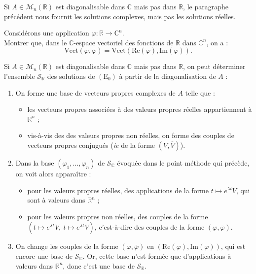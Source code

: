 \documentclass[french]{article}
\newcommand{\R}{\mathbb{R}}
\newcommand{\C}{\mathbb{C}}
\newcommand{\Vect}{\text{Vect}}
\theoremstyle{plain}
\theoremstyle{definition}
\theoremstyle{remark}
\begin{document}
Si $A\in\mathcal{M}_n(\R)$ est diagonalisable dans $\C$ mais pas dans $\R$, le paragraphe précédent nous fournit les solutions complexes, mais pas les solutions réelles.

\begin{exo}
	Considérons une application $\varphi:\R\to\C^n$.\\
	Montrer que, dans le $\C$-espace vectoriel des fonctions de $\R$ dans $\C^n$, on a :
	$$\Vect(\varphi,\overline{\varphi})=\Vect(\text{Re}(\varphi),\text{Im}(\varphi)).$$
\end{exo}

\begin{met}
	Si $A\in\mathcal{M}_n(\R)$ est diagonalisable dans $\C$ mais pas dans $\R$, on peut déterminer l'ensemble $\mathcal{S}_\R$ des solutions de $(\text{E}_0)$ à partir de la diagonalisation de $A$ :
	\begin{enumerate}
		\item On forme une base de vecteurs propres complexes de $A$ telle que :
		\begin{itemize}
			\item les vecteurs propres associées à des valeurs propres réelles appartiennent à $\R^n$ ;
			\item vis-à-vis des des valeurs propres non réelles, on forme des couples de vecteurs propres conjugués (\textit{ie} de la forme $(V,\overline{V})$).
		\end{itemize}
		\item Dans la base $(\varphi_1,\ldots,\varphi_n)$ de $\mathcal{S}_\C$ évoquée dans le point méthode qui précède, on voit alors apparaître :
		\begin{itemize}
			\item pour les valeurs propres réelles, des applications de la forme $t\mapsto e^{\lambda t}V$, qui sont à valeurs dans $\R^n$ ;
			\item pour les valeurs propres non réelles, des couples de la forme $(t\mapsto e^{\lambda t}V,\ t\mapsto e^{\overline{\lambda} t}\overline{V})$, c'est-à-dire des couples de la forme $(\varphi,\overline{\varphi})$.
		\end{itemize}
		\item On change les couples de la forme $(\varphi,\overline{\varphi})$ en $(\text{Re}(\varphi),\text{Im}(\varphi))$, qui est encore une base de $\mathcal{S}_\C$. Or, cette base n'est formée que d'applications à valeurs dans $\R^n$, donc c'est une base de $\mathcal{S}_\R$.
	\end{enumerate}
\end{met}
\end{document}

